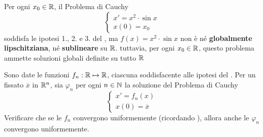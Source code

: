 \begin{example}
	Per ogni $x_0 \in \mathbb{R}$, il Problema di Cauchy
	\begin{equation*}
		\begin{cases}
			x' = x^2 \cdot \sin x\\
			x(0) = x_0
		\end{cases}
	\end{equation*}
	soddisfa le ipotesi 1., 2. e 3. del , ma $f(x) = x^2 \cdot \sin x$ non è né \textbf{globalmente lipschitziana}, né \textbf{sublineare} su $\mathbb{R}$. tuttavia, per ogni $x_0 \in \mathbb{R}$, questo problema ammette soluzioni globali definite su tutto $\mathbb{R}$
\end{example}
\begin{exercise}
	Sono date le funzioni $f_n:\mathbb{R} \mapsto \mathbb{R}$, ciascuna soddisfacente alle ipotesi del . Per un fissato $\overline{x}$ in $\mathbb{R}^n$, sia $\varphi_n$ per ogni $n \in \mathbb{N}$ la soluzione del Problema di Cauchy
	\begin{equation*}
		\begin{cases}
			x' = f_n(x)\\
			x(0) = \overline{x}
		\end{cases}
	\end{equation*}
	Verificare che se le $f_n$ convergono uniformemente (ricordando ), allora anche le $\varphi_n$ convergono uniformemente.
\end{exercise}



